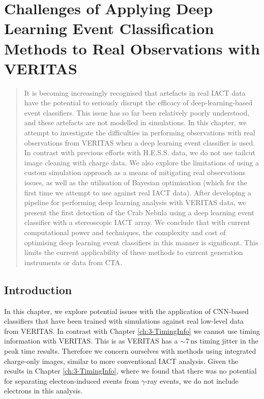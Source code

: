 \chapter{\label{ch:4-VERITASRealData} Challenges of Applying Deep Learning Event Classification Methods to Real Observations with VERITAS}
\minitoc
\begin{abstract}
    It is becoming increasingly recognised that artefacts in real IACT data have the potential to seriously disrupt the efficacy of deep-learning-based event classifiers. This issue has so far been relatively poorly understood, and these artefacts are not modelled in simulations. In this chapter, we attempt to investigate the difficulties in performing observations with real observations from VERITAS when a deep learning event classifier is used. In contrast with previous efforts with H.E.S.S. data, we do not use tailcut image cleaning with charge data. We also explore the limitations of using a custom simulation approach as a means of mitigating real observations issues, as well as the utilisation of Bayesian optimisation (which for the first time we attempt to use against real IACT data). After developing a pipeline for performing deep learning analysis with VERITAS data, we present the first detection of the Crab Nebula using a deep learning event classifier with a stereoscopic IACT array. We conclude that with current computational power and techniques, the complexity and cost of optimising deep learning event classifiers in this manner is significant. This limits the current applicability of these methods to current generation instruments or data from CTA.
\end{abstract}

\section{Introduction}

In this chapter, we explore potential issues with the application of CNN-based classifiers that have been trained with simulations against real low-level data from VERITAS. In contrast with Chapter \ref{ch:3-TimingInfo} we cannot use timing information with VERITAS. This is as VERITAS has a $\mathrm{\sim7\,ns}$ timing jitter in the peak time results. Therefore we concern ourselves with methods using integrated charge-only images, similar to more conventional IACT analysis. Given the results in Chapter \ref{ch:3-TimingInfo}, where we found that there was no potential for separating electron-induced events from $\gamma$-ray events, we do not include electrons in this analysis. 

